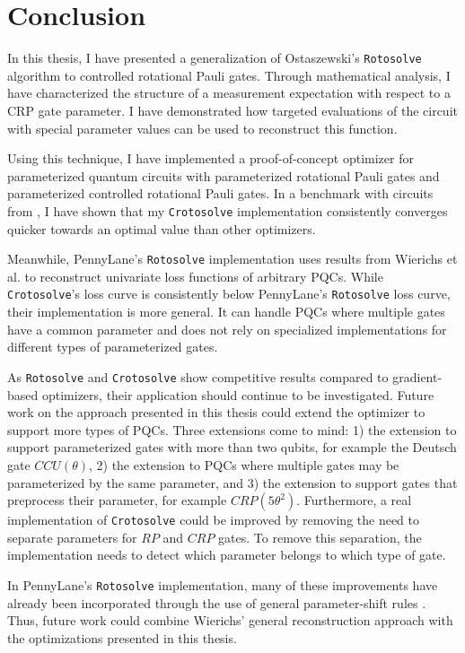 \chapter{Conclusion}
\label{chap:conclusion}

In this thesis, I have presented a generalization of Ostaszewski's
\texttt{Rotosolve} algorithm to controlled rotational Pauli gates.
Through mathematical analysis, I have characterized the structure of a
measurement expectation with respect to a CRP gate parameter.
I have demonstrated how targeted evaluations of the circuit with special
parameter values can be used to reconstruct this function.

Using this technique, I have implemented a proof-of-concept optimizer for
parameterized quantum circuits with parameterized rotational Pauli gates and
parameterized controlled rotational Pauli gates.
In a benchmark with circuits from \cite{sim_expressibility_2019}, I have shown
that my \texttt{Crotosolve} implementation consistently converges quicker
towards an optimal value than other optimizers.

Meanwhile, PennyLane's \texttt{Rotosolve} implementation uses results from
Wierichs et al. \cite{wierichs_general_2022} to reconstruct univariate loss
functions of arbitrary PQCs.
While \texttt{Crotosolve}'s loss curve is consistently below PennyLane's
\texttt{Rotosolve} loss curve, their implementation is more general.
It can handle PQCs where multiple gates have a common parameter and does not
rely on specialized implementations for different types of parameterized gates.

As \texttt{Rotosolve} and \texttt{Crotosolve} show competitive results compared
to gradient-based optimizers, their application should continue to be
investigated.
Future work on the approach presented in this thesis could extend the optimizer
to support more types of PQCs.
Three extensions come to mind: 1) the extension to support parameterized gates
with more than two qubits, for example the Deutsch gate $CCU(\theta)$, 2) the
extension to PQCs where multiple gates may be parameterized by the same
parameter, and 3) the extension to support gates that preprocess their
parameter, for example $CRP(5\theta^2)$.
Furthermore, a real implementation of \texttt{Crotosolve} could be improved by
removing the need to separate parameters for $RP$ and $CRP$ gates.
To remove this separation, the implementation needs to detect which parameter
belongs to which type of gate.

In PennyLane's \texttt{Rotosolve} implementation, many of these improvements
have already been incorporated through the use of general parameter-shift rules
\cite{wierichs_general_2022}.
Thus, future work could combine Wierichs' general reconstruction approach with
the optimizations presented in this thesis.
%
